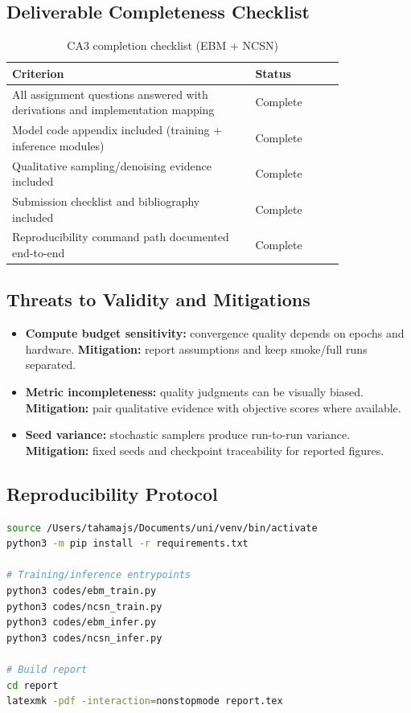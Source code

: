 \documentclass[a4paper,12pt]{article}
\begin{document}
\subsection{Deliverable Completeness Checklist}
\begin{table}[!t]
\centering
\caption{CA3 completion checklist (EBM + NCSN)}
\begin{tabular}{|p{0.60\linewidth}|p{0.22\linewidth}|}
\hline
\textbf{Criterion} & \textbf{Status} \\
\hline
All assignment questions answered with derivations and implementation mapping & Complete \\
\hline
Model code appendix included (training + inference modules) & Complete \\
\hline
Qualitative sampling/denoising evidence included & Complete \\
\hline
Submission checklist and bibliography included & Complete \\
\hline
Reproducibility command path documented end-to-end & Complete \\
\hline
\end{tabular}
\label{tab:ca3_completion_checklist}
\end{table}

\subsection{Threats to Validity and Mitigations}
\begin{itemize}
    \item \textbf{Compute budget sensitivity:} convergence quality depends on epochs and hardware. \textbf{Mitigation:} report assumptions and keep smoke/full runs separated.
    \item \textbf{Metric incompleteness:} quality judgments can be visually biased. \textbf{Mitigation:} pair qualitative evidence with objective scores where available.
    \item \textbf{Seed variance:} stochastic samplers produce run-to-run variance. \textbf{Mitigation:} fixed seeds and checkpoint traceability for reported figures.
\end{itemize}

\subsection{Reproducibility Protocol}
\begin{lstlisting}[language=bash]
source /Users/tahamajs/Documents/uni/venv/bin/activate
python3 -m pip install -r requirements.txt

# Training/inference entrypoints
python3 codes/ebm_train.py
python3 codes/ncsn_train.py
python3 codes/ebm_infer.py
python3 codes/ncsn_infer.py

# Build report
cd report
latexmk -pdf -interaction=nonstopmode report.tex
\end{lstlisting}
\end{document}
